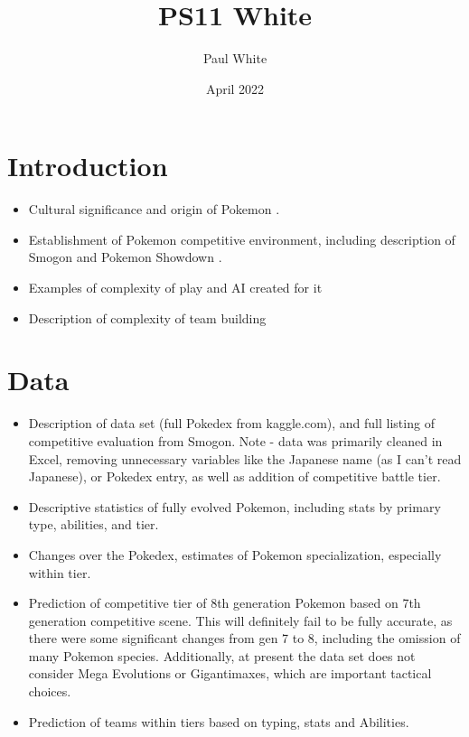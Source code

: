 \documentclass{article}
\title{PS11 White}
\author{Paul White}
\date{April 2022}
\begin{document}
\maketitle

\section{Introduction}

\begin{itemize}
    \item Cultural significance and origin of Pokemon \citep{bainbridge,schmidt, phylogeny}.
    \item Establishment of Pokemon competitive environment, including description of Smogon and Pokemon Showdown \citep{zielke,minmax}.
    \item Examples of complexity of play and AI created for it \citep{huang,minmax,reinforcement,zielke, settings}
    \item Description of complexity of team building \citep{Verdear}
\end{itemize}

\section{Data}

\begin{itemize}
    \item Description of data set (full Pokedex from kaggle.com), and full listing of competitive evaluation from Smogon. Note - data was primarily cleaned in Excel, removing unnecessary variables like the Japanese name (as I can't read Japanese), or Pokedex entry, as well as addition of competitive battle tier.
    \item Descriptive statistics of fully evolved Pokemon, including stats by primary type, abilities, and tier.
    \item Changes over the Pokedex, estimates of Pokemon specialization, especially within tier.
    \item Prediction of competitive tier of 8th generation Pokemon based on 7th generation competitive scene. This will definitely fail to be fully accurate, as there were some significant changes from gen 7 to 8, including the omission of many Pokemon species. Additionally, at present the data set does not consider Mega Evolutions or Gigantimaxes, which are important tactical choices.
    \item Prediction of teams within tiers based on typing, stats and Abilities.
\end{itemize}
\end{document}
